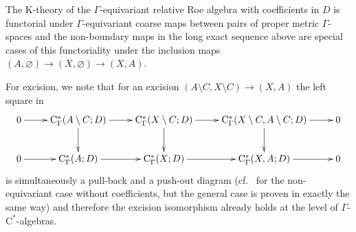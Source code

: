 \documentclass[pdftex]{sigma}
\numberwithin{equation}{section}
\theoremstyle{definition}
\newcommand{\K}{\mathrm{K}}
\newcommand{\textCstar}{\ensuremath{\mathrm{C}^*\!}}
\newcommand{\Roe}{\mathrm{C}^*}
\begin{document}
The $\K$-theory of the $\Gamma$-equivariant relative Roe algebra with coefficients in $D$ is functorial under $\Gamma$-equivariant coarse maps between pairs of proper metric $\Gamma$-spaces and the non-boundary maps in the long exact sequence above are special cases of this functoriality under the inclusion maps $(A,\varnothing)\to(X,\varnothing)\to (X,A)$.



For excision, we note that for an excision $(A\setminus C,X\setminus C)\to (X,A)$ the left square in
\[
\xymatrix{
0\ar[r]&\Roe_\Gamma(A\setminus C;D)\ar[r]\ar[d]&\Roe_\Gamma(X\setminus C;D)\ar[r]\ar[d]&\Roe_\Gamma(X\setminus C,A\setminus C;D)\ar[r]\ar[d]&0
\\0\ar[r]&\Roe_\Gamma(A;D)\ar[r]&\Roe_\Gamma(X;D)\ar[r]&\Roe_\Gamma(X,A;D)\ar[r]&0
}
\]
is simultaneously a pull-back and a push-out diagram (cf.\ \cite[p.~156]{HigRoe} for the non-equivariant case without coefficients, but the general case is proven in exactly the same way) and therefore the excision isomorphism already holds at the level of $\Gamma$-\textCstar-algebras.
\end{document}
